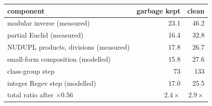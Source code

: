\begin{tabular}{lrr}
\toprule
component & garbage kept & clean \\
\midrule
modular inverse (measured) & 23.1 & 46.2\\
partial Euclid (measured) & 16.4 & 32.8\\
NUDUPL products, divisions (measured) & 17.8 & 26.7\\
small-form composition (modelled) & 15.8 & 27.6\\
\midrule
class-group step & 73 & 133\\
integer Regev step (modelled) & 17.0 & 25.5\\
total ratio after $\times0.56$ & $2.4\times$ & $2.9\times$\\
\bottomrule
\end{tabular}